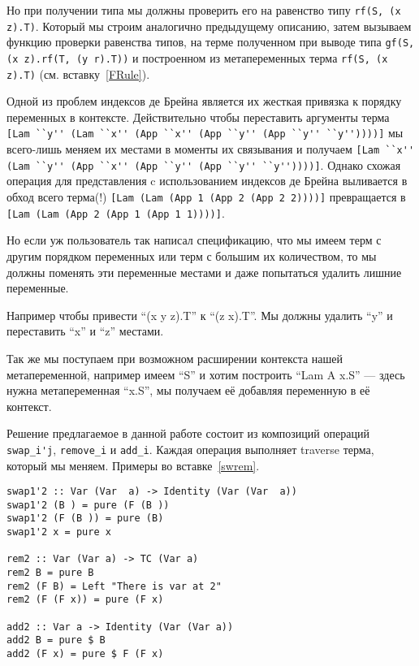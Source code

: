Но при получении типа мы должны проверить его на равенство типу  \lstinline{rf(S, (x z).T)}. Который мы строим аналогично предыдущему описанию, затем вызываем функцию проверки равенства типов, на терме полученном при выводе типа \lstinline{gf(S, (x z).rf(T, (y r).T))} и построенном из метапеременных терма \lstinline{rf(S, (x z).T)} (см. вставку~\ref{FRule}).

\hfill

Одной из проблем индексов де Брейна является их жесткая привязка к порядку переменных в контексте. Действительно чтобы переставить аргументы терма \lstinline{[Lam ``y'' (Lam ``x'' (App ``x'' (App ``y'' (App ``y'' ``y''))))]} мы всего-лишь меняем их местами в моменты их связывания и получаем \lstinline{[Lam ``x'' (Lam ``y'' (App ``x'' (App ``y'' (App ``y'' ``y''))))]}. Однако схожая операция для представления c использованием индексов де Брейна выливается в обход всего терма(!) \lstinline{[Lam (Lam (App 1 (App 2 (App 2 2))))]} превращается в \lstinline{[Lam (Lam (App 2 (App 1 (App 1 1))))]}.

Но если уж пользователь так написал спецификацию, что мы имеем терм с другим порядком переменных или терм с большим их количеством, то мы должны поменять эти переменные местами и даже попытаться удалить лишние переменные.

Например чтобы привести ``(x y z).T'' к ``(z x).T''. Мы должны удалить ``y'' и переставить ``x'' и ``z'' местами.

Так же мы поступаем при возможном расширении контекста нашей метапеременной, например имеем ``S'' и хотим построить ``Lam A x.S'' --- здесь нужна метапеременная ``x.S'', мы получаем её добавляя переменную в её контекст.

Решение предлагаемое в данной работе состоит из композиций операций \lstinline{swap_i'j}, \lstinline{remove_i} и \lstinline{add_i}. Каждая операция выполняет traverse терма, который мы меняем. Примеры во вставке~\ref{swrem}.

\begin{lstlisting}[label={swrem}, caption={Примеры функций},captionpos=b, frame=single, float, floatplacement=H]
swap1'2 :: Var (Var  a) -> Identity (Var (Var  a))
swap1'2 (B ) = pure (F (B ))
swap1'2 (F (B )) = pure (B)
swap1'2 x = pure x

rem2 :: Var (Var a) -> TC (Var a)
rem2 B = pure B
rem2 (F B) = Left "There is var at 2"
rem2 (F (F x)) = pure (F x)

add2 :: Var a -> Identity (Var (Var a))
add2 B = pure $ B
add2 (F x) = pure $ F (F x)
\end{lstlisting}

